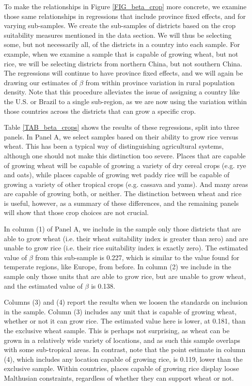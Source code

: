 \documentclass[11pt]{article}
\begin{document}
To make the relationships in Figure \ref{FIG_beta_crop} more concrete, we examine those same relationships in regressions that include province fixed effects, and for varying sub-samples. We create the sub-samples of districts based on the crop suitability measures mentioned in the data section. We will thus be selecting some, but not necessarily all, of the districts in a country into each sample. For example, when we examine a sample that is capable of growing wheat, but not rice, we will be selecting districts from northern China, but not southern China. The regressions will continue to have province fixed effects, and we will again be drawing our estimates of $\beta$ from within province variation in rural population density. Note that this procedure alleviates the issue of assigning a country like the U.S. or Brazil to a single sub-region, as we are now using the variation within those countries across the districts that can grow a specific crop.

Table \ref{TAB_beta_crops} shows the results of these regressions, split into three panels. In Panel A, we select samples based on their ability to grow rice versus wheat. This has been a typical way of distinguishing agricultural systems, although one should not make this distinction too severe. Places that are capable of growing wheat will be capable of growing a variety of dry cereal crops (e.g. rye and oats), while places capable of growing wet paddy rice will be capable of growing a variety of other tropical crops (e.g. cassava and yams). And many areas are capable of growing both, or neither. The distinction between wheat and rice is useful, however, as a summary of these differences, and the remaining panels will show that those crop choices are not crucial.

In column (1) of Panel A, we include in the sample only those districts that are able to grow wheat (i.e. their wheat suitability index is greater than zero) and are unable to grow rice (i.e. their rice suitability index is exactly zero). The estimated value of $\beta$ from this sub-sample is 0.227, which is similar to the value found for temperate regions, like Europe, from before. In column (2) we include in the sample only those units that are able to grow rice, but are unable to grow wheat, and the estimated value of $\beta$ is 0.138.

Columns (3) and (4) report the results when we loosen the standards on inclusion in the sample. Column (3) includes any unit that is capable of growing wheat, whether or not it can grow rice. The estimated value here is lower, at 0.181, than the exclusive wheat sample. This is perhaps not surprising, as wheat can be grown in a relatively wide variety of locations, and as such this sample overlaps with some sub-tropical areas. In contrast, note that the point estimate in column (4), which includes any location capable of growing rice, is 0.119, lower than the exclusive sample. Within countries, places capable of growing rice display loose Malthusian constraints, regardless of whether they can support wheat or not.
\end{document}
